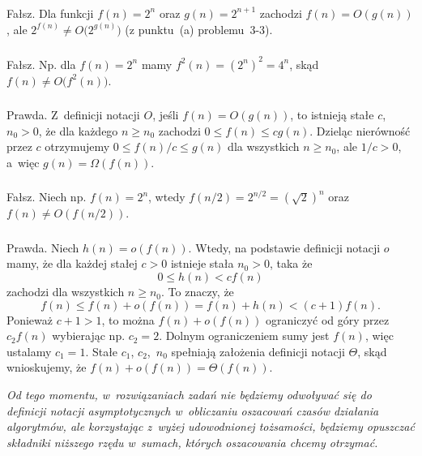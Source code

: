 \subsubsection{} %
Fałsz. Dla funkcji $f(n)=2^n$ oraz $g(n)=2^{n+1}$ zachodzi $f(n)=O(g(n))$, ale $2^{f(n)}\ne O\bigl(2^{g(n)}\bigr)$ (z punktu~(a) problemu~3-3).

\subsubsection{} %
Fałsz. Np. dla $f(n)=2^n$ mamy $f^2(n)=(2^n)^2=4^n$, skąd $f(n)\ne O\bigl(f^2(n)\bigr)$.

\subsubsection{} %
Prawda. Z~definicji notacji $O$, jeśli $f(n)=O(g(n))$, to istnieją stałe $c$,~$n_0>0$, że dla każdego $n\ge n_0$ zachodzi $0\le f(n)\le cg(n)$. Dzieląc nierówność przez $c$ otrzymujemy $0\le f(n)/c\le g(n)$ dla wszystkich $n\ge n_0$, ale $1/c>0$, a~więc $g(n)=\Omega(f(n))$.

\subsubsection{} %
Fałsz. Niech np. $f(n)=2^n$, wtedy $f(n/2)=2^{n/2}={(\!\sqrt{2})}^n$ oraz $f(n)\ne O(f(n/2))$.

\subsubsection{} %
Prawda. Niech $h(n)=o(f(n))$. Wtedy, na podstawie definicji notacji $o$ mamy, że dla każdej stałej $c>0$ istnieje stała $n_0>0$, taka że
\[
	0 \le h(n) < cf(n)
\]
zachodzi dla wszystkich $n\ge n_0$. To znaczy, że
\[
	f(n) \le f(n)+o(f(n)) = f(n)+h(n) < (c+1)f(n).
\]
Ponieważ $c+1>1$, to można $f(n)+o(f(n))$ ograniczyć od góry przez $c_2f(n)$ wybierając np. $c_2=2$. Dolnym ograniczeniem sumy jest $f(n)$, więc ustalamy $c_1=1$. Stałe $c_1$, $c_2$,~$n_0$ spełniają założenia definicji notacji $\Theta$, skąd wnioskujemy, że $f(n)+o(f(n))=\Theta(f(n))$.

\bigskip
\noindent\emph{Od tego momentu, w~rozwiązaniach zadań nie będziemy odwoływać się do definicji notacji asymptotycznych w~obliczaniu oszacowań czasów działania algorytmów, ale korzystając z~wyżej udowodnionej tożsamości, będziemy opuszczać składniki niższego rzędu w~sumach, których oszacowania chcemy otrzymać.}


